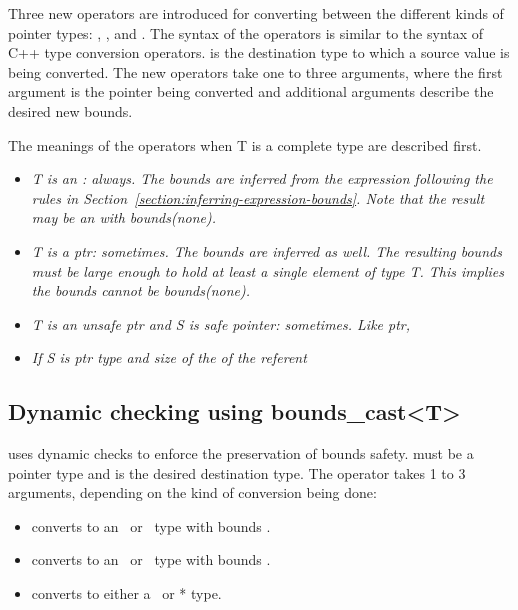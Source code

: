 Three new operators are introduced for converting between the different
kinds of pointer types:
,
,
and .
The syntax of the operators is similar to the syntax of C++ type
conversion operators.  is the destination type to which a source
value is being converted. The new operators take one to three arguments,
where the first argument is the pointer being converted and additional
arguments describe the desired new bounds.

The meanings of the operators when T is a complete type are described
first.

\begin{quote}
\end{quote}

\begin{itemize}
\item
  \it{T is an \arrayptr: always. The bounds are inferred from the
  expression following the rules in Section~\ref{section:inferring-expression-bounds}.
   Note that the result may
  be an \arrayptr with bounds(none).}
\item
  \it{T is a ptr: sometimes. The bounds are inferred as well. The
  resulting bounds must be large enough to hold at least a single
  element of type T. This implies the bounds cannot be bounds(none).}
\item
  \it{T is an unsafe ptr and S is safe pointer: sometimes. Like ptr, }
    \item
    \it{If S is ptr type and size of the of the referent }
\end{itemize}

\subsection{Dynamic checking using bounds\_cast\textless{}T\textgreater{}}

 uses
dynamic checks to enforce the preservation of bounds safety. 
must be a pointer type and is the desired destination type. The operator
takes 1 to 3 arguments, depending on the kind of conversion being done:

\begin{itemize}
\item
   converts  to an \arrayptr\ or
  \arrayview\ type with bounds .
\item
   converts  to an
  \arrayptr\ or \arrayview\ type with bounds
  .
\item
  converts  to either a \ptr\ or * type.
\end{itemize}

